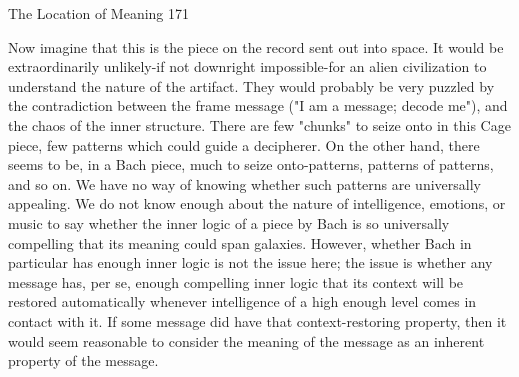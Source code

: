 The Location of Meaning                                                                    171

        Now imagine that this is the piece on the record sent out into space. It would be
extraordinarily unlikely-if not downright impossible-for an alien civilization to
understand the nature of the artifact. They would probably be very puzzled by the
contradiction between the frame message ("I am a message; decode me"), and the chaos
of the inner structure. There are few "chunks" to seize onto in this Cage piece, few
patterns which could guide a decipherer. On the other hand, there seems to be, in a Bach
piece, much to seize onto-patterns, patterns of patterns, and so on. We have no way of
knowing whether such patterns are universally appealing. We do not know enough about
the nature of intelligence, emotions, or music to say whether the inner logic of a piece by
Bach is so universally compelling that its meaning could span galaxies.
        However, whether Bach in particular has enough inner logic is not the issue here;
the issue is whether any message has, per se, enough compelling inner logic that its
context will be restored automatically whenever intelligence of a high enough level
comes in contact with it. If some message did have that context-restoring property, then it
would seem reasonable to consider the meaning of the message as an inherent property of
the message.

